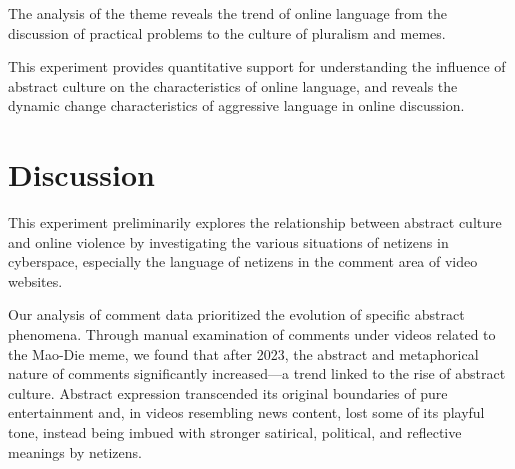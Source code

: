 \documentclass[12pt,a4paper]{ctexart}
\theoremstyle{MyLineTheoremStyle}
\theoremstyle{MyBlockTheoremStyle}
\theoremstyle{MySubsubsectionStyle}
\begin{document}
The analysis of the theme reveals the trend of online language from the discussion of practical problems to the culture of pluralism and memes.

This experiment provides quantitative support for understanding the influence of abstract culture on the characteristics of online language, and reveals the dynamic change characteristics of aggressive language in online discussion.

\section{Discussion}

This experiment preliminarily explores the relationship between abstract culture and online violence by investigating the various situations of netizens in cyberspace, especially the language of netizens in the comment area of video websites.


Our analysis of comment data prioritized the evolution of specific abstract phenomena. Through manual examination of comments under videos related to the Mao-Die meme, we found that after 2023, the abstract and metaphorical nature of comments significantly increased—a trend linked to the rise of abstract culture. Abstract expression transcended its original boundaries of pure entertainment and, in videos resembling news content, lost some of its playful tone, instead being imbued with stronger satirical, political, and reflective meanings by netizens.
\end{document}
